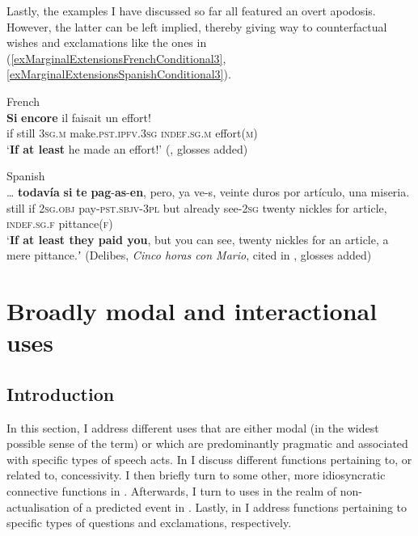 Lastly, the examples I have discussed so far all featured an overt apodosis. However, the latter can be left implied, thereby giving way to counterfactual wishes and exclamations like the ones in (\ref{exMarginalExtensionsFrenchConditional3}, \ref{exMarginalExtensionsSpanishConditional3}). 

\begin{exe}
	\ex French\label{exMarginalExtensionsFrenchConditional3}\\
\gll \textbf{Si} \textbf{encore} il faisait un effort!\\
if still 3\textsc{sg}.\textsc{m} make.\textsc{pst}.\textsc{ipfv}.3\textsc{sg} \textsc{indef}.\textsc{sg}.\textsc{m} effort(\textsc{m})\\
\glt \lq \textbf{If at least} he made an effort!' (\cite[83]{VictorriFuchs1996}, glosses added)	

	\ex Spanish\label{exMarginalExtensionsSpanishConditional3}\\
		 \gll … \textbf{todavía} \textbf{si} \textbf{te} \textbf{pag}-\textbf{as}-\textbf{en}, pero, ya ve-s, veinte duros por artículo, una miseria.\\
	{} still if 2\textsc{sg}.\textsc{obj} pay-\textsc{pst}.\textsc{sbjv}-3\textsc{pl} but already see-2\textsc{sg} twenty nickles for article, \textsc{indef}.\textsc{sg}.\textsc{f} pittance(\textsc{f})\\
	\glt \lq \textbf{If at least they paid you}, but you can see, twenty nickles for an article, a mere pittance.ʼ (Delibes, \textit{Cinco horas con Mario}, cited in \cite[222]{Bosque2016}, glosses added)
\end{exe}
 

\section{Broadly modal and interactional uses}
\label{sectionBroadlyModal}
\subsection{Introduction}
In this section, I address different uses that are either modal (in the widest possible sense of the term) or which are predominantly pragmatic and associated with specific types of speech acts. In  I discuss different functions pertaining to, or related to, concessivity.  I then briefly turn to some other, more idiosyncratic connective functions in . Afterwards, I turn to uses in the realm of non-actualisation of a predicted event in . Lastly, in  I address functions pertaining to specific types of questions and exclamations, respectively.
